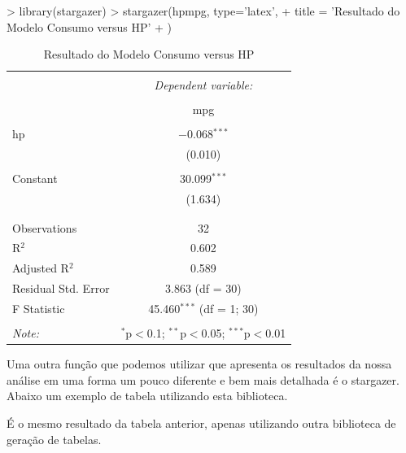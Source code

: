 \documentclass[12pt,a4paper,oneside]{erdc}
\begin{document}
\begin{Schunk}
\begin{Sinput}
> library(stargazer)
> stargazer(hpmpg, type='latex', 
+           title = 'Resultado do Modelo Consumo versus HP'
+           )
\end{Sinput}
\begin{table}[!htbp] \centering 
  \caption{Resultado do Modelo Consumo versus HP} 
  \label{} 
\begin{tabular}{@{\extracolsep{5pt}}lc} 
\\[-1.8ex]\hline 
\hline \\[-1.8ex] 
 & \multicolumn{1}{c}{\textit{Dependent variable:}} \\ 
\cline{2-2} 
\\[-1.8ex] & mpg \\ 
\hline \\[-1.8ex] 
 hp & $-$0.068$^{***}$ \\ 
  & (0.010) \\ 
  & \\ 
 Constant & 30.099$^{***}$ \\ 
  & (1.634) \\ 
  & \\ 
\hline \\[-1.8ex] 
Observations & 32 \\ 
R$^{2}$ & 0.602 \\ 
Adjusted R$^{2}$ & 0.589 \\ 
Residual Std. Error & 3.863 (df = 30) \\ 
F Statistic & 45.460$^{***}$ (df = 1; 30) \\ 
\hline 
\hline \\[-1.8ex] 
\textit{Note:}  & \multicolumn{1}{r}{$^{*}$p$<$0.1; $^{**}$p$<$0.05; $^{***}$p$<$0.01} \\ 
\end{tabular} 
\end{table} \end{Schunk}

Uma outra função que podemos utilizar que apresenta os resultados da nossa análise em uma forma um pouco diferente e bem mais detalhada é o stargazer. Abaixo um exemplo de tabela utilizando esta biblioteca.

É o mesmo resultado da tabela anterior, apenas utilizando outra biblioteca de geração de tabelas.
		
\end{document}
